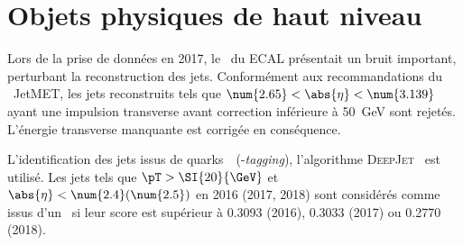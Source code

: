 \chapter{Objets physiques de haut niveau}\label{chapter-HLO}

















Lors de la prise de données en 2017, le \CMSendcap\ du ECAL présentait un bruit important, perturbant la reconstruction des jets.
Conformément aux recommandations du \POG\ JetMET, les jets reconstruits tels que $\num{2.65} < \abs{\eta} < \num{3.139}$ ayant une impulsion transverse avant correction inférieure à \SI{50}{\GeV} sont rejetés.
L'énergie transverse manquante est corrigée en conséquence.



L'identification des jets issus de quarks~\quarkb\ (\quarkb-\emph{tagging}), l'algorithme \textsc{DeepJet}~\cite{DeepJet} est utilisé.
Les jets tels que $\pT > \SI{20}{\GeV}$ et $\abs{\eta}<\num{2.4} (\num{2.5})$ en 2016 (2017, 2018) sont considérés comme issus d'un \quarkb\ si leur score est supérieur à \num{0.3093} (2016), \num{0.3033} (2017) ou \num{0.2770} (2018).




